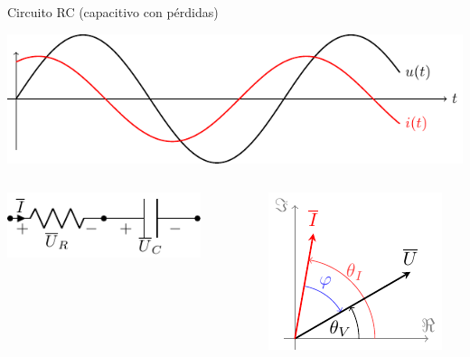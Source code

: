 \documentclass[aspectratio=169, usenames,svgnames,dvipsnames]{beamer}
\begin{document}
\begin{frame}[label={sec:org9fbdc9d}]{Circuito RC (capacitivo con pérdidas)}
\begin{center}
\includegraphics[height=0.25\textheight]{../figs/capacitivo.pdf}
\end{center}


\begin{columns}
\begin{column}{0.45\columnwidth}
\begin{center}
\includegraphics[width=0.8\textwidth]{../figs/RC.pdf}
\end{center}
\end{column}

\begin{column}{0.55\columnwidth}
\begin{center}
\includegraphics[height=0.45\textheight]{../figs/fasorCondensadorReal_VI.pdf}
\end{center}
\end{column}
\end{columns}
\end{frame}
\end{document}
